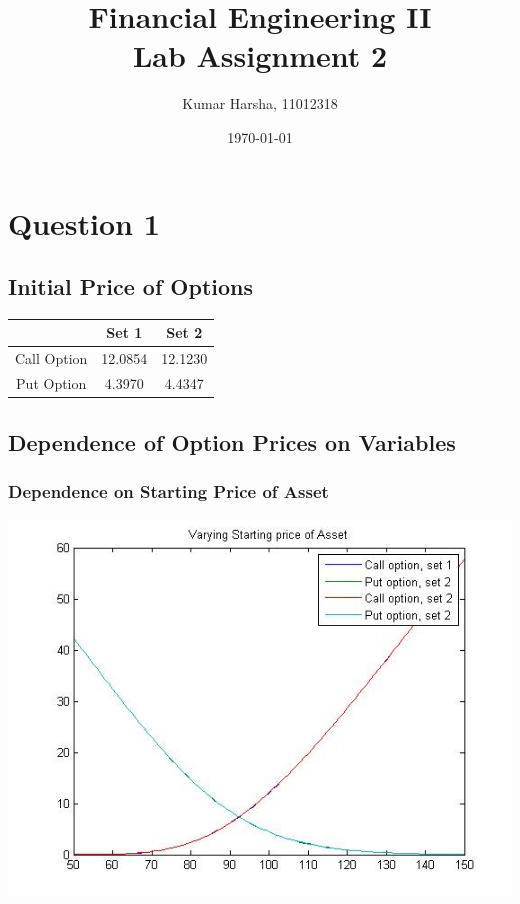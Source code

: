 \documentclass[12pt]{article}
\begin{document}
\title{Financial Engineering II\\Lab Assignment 2}
\author{Kumar Harsha, 11012318}
\date{\today}
\maketitle
\tableofcontents
\newpage

\section{Question 1}
  \subsection{Initial Price of Options}
  \begin{center}
  \begin{tabular}{c|c|c}
   &Set 1 &Set 2\\ \hline
  Call Option &12.0854 &12.1230\\
  Put Option &4.3970 &4.4347\\ \hline
  \end{tabular}
  \end{center}
  
 
  \subsection{Dependence of Option Prices on Variables}
    \subsubsection*{Dependence on Starting Price of Asset}
    \begin{center}
      \includegraphics[width=6in]{asset.jpg}
    \end{center}
\end{document}
